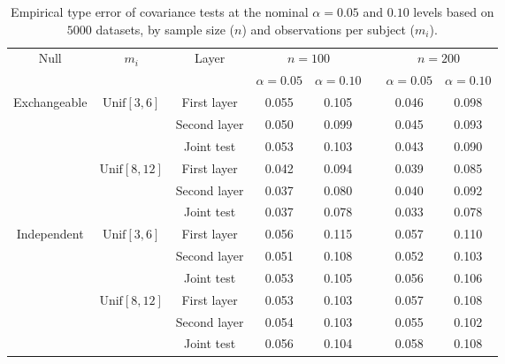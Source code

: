 \documentclass[submit]{smj}
\begin{document}
\begin{table}[!h]
	\centering
	\caption{Empirical type \uppercase\expandafter{} error of covariance tests at the nominal $\alpha=0.05$ and $0.10$ levels based on $5000$ datasets, by sample size ($n$) and observations per subject ($m_i$).}
	\label{tab:size}
	\begin{adjustbox}{width=\textwidth}
	\begin{tabular}{c|c|c|ccccc}
		\hline
		\multirow{2}{*}{Null}&\multirow{2}{*}{$m_i$}& \multirow{2}{*}{Layer} & \multicolumn{2}{c}{$n=100$}&& \multicolumn{2}{c}{$n=200$}\\
		&&& $\alpha=0.05$ & $\alpha=0.10$ && $\alpha=0.05$ & $\alpha=0.10$\\
		\hline
		\multirow{6}{*}{Exchangeable}&	\multirow{3}{*}{$\text{Unif}[3,6]$}	 &First layer& 0.055 &0.105 && 0.046&0.098 \\
		& & Second layer & 0.050 &0.099 && 0.045 & 0.093 \\
		& & Joint test & 0.053 &0.103 && 0.043&0.090 \\
		\cline{2-8}
		&	\multirow{3}{*}{$\text{Unif}[8,12]$} &First layer& 0.042 &0.094 && 0.039 & 0.085\\	
		& & Second layer & 0.037 & 0.080 && 0.040 & 0.092 \\
		& & Joint test & 0.037 &0.078&& 0.033 & 0.078  \\			
		\hline
		\multirow{6}{*}{Independent}&	\multirow{3}{*}{$\text{Unif}[3,6]$}	 &First layer& 0.056 &0.115 && 0.057& 0.110   \\
		& & Second layer & 0.051 & 0.108 && 0.052 & 0.103 \\
		& & Joint test & 0.053 & 0.105  && 0.056 & 0.106 \\	
		\cline{2-8}
		&	\multirow{3}{*}{$\text{Unif}[8,12]$} &First layer& 0.053 & 0.103 && 0.057 & 0.108	\\
		& & Second layer & 0.054 & 0.103 && 0.055 & 0.102  \\
		& & Joint test & 0.056 & 0.104 &&0.058 & 0.108 \\
		\hline	
	\end{tabular}
	\end{adjustbox}
\end{table}
\end{document}

